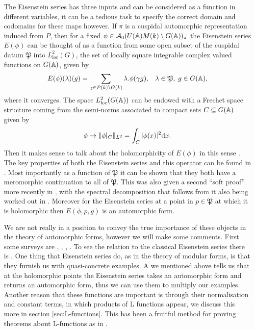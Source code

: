The Eisenstein series has three inputs and can be considered as a function in different variables, it can be a tedious task to specify the correct domain and codomains for these maps however. If \(\pi\) is a cuspidal automorphic representation induced from \(P\), then for a fixed \(\phi \in\mathcal{A}_0(U(\A)M(k)\setminus G(\A))_\pi \) the Eisenstein series \(E(\phi)\) can be thought of as a function from some open subset of the cuspidal datum \(\mathfrak{P}\) into \(L^2_{\mathrm{loc}}(G)\), the set of locally square integrable complex valued functions on \(G(\A)\), given by 
\[E(\phi)(\lambda)(g) = \sum_{\gamma \in P(k)\backslash G(k)} \lambda.\phi(\gamma g), \;\;\; \lambda\in \mathfrak{P},\; g\in G(\A),\]
where it converges. The space \(L^2_{\mathrm{loc}}(G(\A))\) can be endowed with a Frechet space structure coming from the semi-norms associated to compact sets \(C\subseteq G(\A)\) given by 
\[\phi \mapsto \norm{\phi|_C}_{L^2} = \int_C |\phi(x)|^2 \mathrm{d}x.\] 
Then it makes sense to talk about the holomorphicity of \(E(\phi)\) in this sense \cite[I.4.9]{moeglinSpectralDecompositionEisenstein1995}. The key properties of both the Eisenstein series and this operator can be found in \cite[IV.1.8, IV.1.9, IV.1.10, IV.1.11]{moeglinSpectralDecompositionEisenstein1995}. Most importantly as a function of \(\mathfrak{P}\) it can be shown that they both have a meromorphic continuation to all of \(\mathfrak{P}\). This was also given a second ``soft proof'' more recently in \cite{bernsteinMeromorphicContinuationEisenstein2022}, with the spectral decomposition that follows from it also being worked out in \cite{delormeSpectralTheoremLanglands2021}. Moreover for the Eisenstein series at a point in \(p\in \mathfrak{P}\) at which it is holomorphic then \(E(\phi,p, g)\) is an automorphic form. 

We are not really in a position to convey the true importance of these objects in the theory of automorphic forms, however we will make some comments. First some surveys are \cite{lapidPerspectivesEisensteinSeries2022}, \cite{arthurEisensteinSeriesTrace1979}, \cite{kimEISENSTEINSERIESTHEIR}, \cite{jiangResiduesEisensteinSeries2008a}. To see the relation to the classical Eisenstein series there is \cite{garrettTransitionEisensteinSeries2016}. One thing that Eisenstein series do, as in the theory of modular forms, is that they furnish us with quasi-concrete examples. A we mentioned above \cite[IV.1.9.(b).i]{moeglinSpectralDecompositionEisenstein1995} tells us that at the holomorphic points the Eisenstein series takes an automorphic form and returns an automorphic form, thus we can use them to multiply our examples. Another reason that these functions are important is through their normalisation and constant terms, in which products of L functions appear, we discuss this more in section \ref{sec:L-functions}. This has been a fruitful method for proving theorems about L-functions as in \cite{shahidiEisensteinSeriesAutomorphic2010}\cite{pollackRANKINSELBERGMETHODUSER}\cite{arthurEisensteinSeriesTrace1979}.

